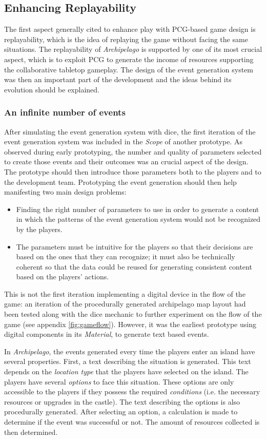 \subsection{Enhancing Replayability} 
The first aspect generally cited to enhance play with PCG-based game design is replayability, which is the idea of replaying the game without facing the same situations. The replayability of \textit{Archipelago} is supported by one of its most crucial aspect, which is to exploit PCG to generate the income of resources supporting the collaborative tabletop gameplay. The design of the event generation system was then an important part of the development and the ideas behind its evolution should be explained.
\subsubsection{An infinite number of events}
After simulating the event generation system with dice, the first iteration of the event generation system was included in the \textit{Scope} of another prototype. As observed during early prototyping, the number and quality of parameters selected to create those events and their outcomes was an crucial aspect of the design. The prototype should then introduce those parameters both to the players and to the development team. Prototyping the event generation should then help manifesting two main design problems:
\begin{itemize}
\item Finding the right number of parameters to use in order to generate a content in which the patterns of the event generation system would not be recognized by the players.
\item The parameters must be intuitive for the players so that their decisions are based on the ones that they can recognize; it must also be technically coherent so that the data could be reused for generating consistent content based on the players' actions.
\end{itemize}
This is not the first iteration implementing a digital device in the flow of the game: an iteration of the procedurally generated archipelago map layout had been tested along with the dice mechanic to further experiment on the flow of the game (see appendix \ref{fig:gameflow}). However, it was the earliest prototype using digital components in its \textit{Material}, to generate text based events.

In \textit{Archipelago}, the events generated every time the players enter an island have several properties. First, a text describing the situation is generated. This text depends on the \textit{location type} that the players have selected on the island. The players have several \textit{options} to face this situation. These options are only accessible to the players if they possess the required \textit{conditions} (i.e. the necessary resources or upgrades in the castle). The text describing the options is also procedurally generated. After selecting an option, a calculation is made to determine if the event was successful or not. The amount of resources collected is then determined. 
